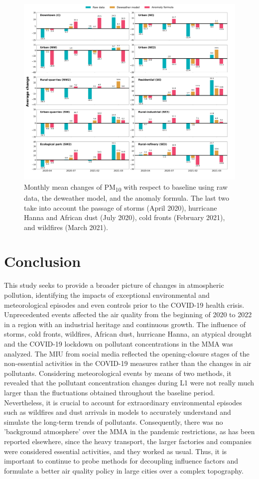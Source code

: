 \documentclass[preprint,12pt]{elsarticle}
\begin{document}
\begin{figure}[ht!]
    \centering
    \includegraphics[width=\linewidth]{figures/average_change_deweather_fourier.png}
    \caption{Monthly mean changes of PM\textsubscript{10} with respect to baseline using raw data, the deweather model, and the anomaly formula. The last two take into account the passage of storms (April 2020), hurricane Hanna and African dust (July 2020), cold fronts (February 2021), and wildfires (March 2021).
}
\label{fig:average_change_deweather_fourier}
\end{figure}    
\section*{Conclusion}
This study seeks to provide a broader picture of changes in atmospheric pollution, identifying the impacts of exceptional environmental and meteorological episodes and even controls prior to the COVID-19 health crisis. Unprecedented events affected the air quality from the beginning of 2020 to 2022 in a region with an industrial heritage and continuous growth. The influence of storms, cold fronts, wildfires, African dust, hurricane Hanna, an atypical drought and the COVID-19 lockdown on pollutant concentrations in the MMA was analyzed. The MIU from social media reflected the opening-closure stages of the non-essential activities in the COVID-19 measures rather than the changes in air pollutants.  Considering meteorological events by means of two methods, it revealed that the pollutant concentration changes during L1 were not really much larger than the fluctuations obtained throughout the baseline period. Nevertheless, it is crucial to account for extraordinary environmental episodes such as wildfires and dust arrivals in models to accurately understand and simulate the long-term trends of pollutants. Consequently, there was no 'background atmosphere' over the MMA in the pandemic restrictions, as has been reported elsewhere, since the heavy transport, the larger factories and companies were considered essential activities, and they worked as usual. Thus, it is important to continue to probe methods for decoupling influence factors and formulate a better air quality policy in large cities over a complex topography.
\end{document}
